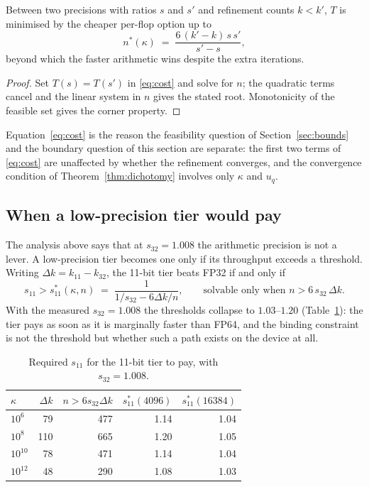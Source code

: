 \begin{proposition}\label{prop:corner}
Between two precisions with ratios $s$ and $s'$ and refinement counts $k<k'$,
$T$ is minimised by the cheaper per-flop option up to
\begin{equation}
  n^{\ast}(\kappa) \;=\; \frac{6\,(k'-k)\,s\,s'}{s'-s},
\end{equation}
beyond which the faster arithmetic wins despite the extra iterations.
\end{proposition}

\begin{proof}
Set $T(s)=T(s')$ in \eqref{eq:cost} and solve for $n$; the quadratic terms cancel
and the linear system in $n$ gives the stated root. Monotonicity of the feasible
set gives the corner property.
\end{proof}

\begin{remark}
Equation~\eqref{eq:cost} is the reason the feasibility question of
Section~\ref{sec:bounds} and the boundary question of this section are separate:
the first two terms of \eqref{eq:cost} are unaffected by whether the refinement
converges, and the convergence condition of Theorem~\ref{thm:dichotomy} involves
only $\kappa$ and $u_q$.
\end{remark}

\subsection{When a low-precision tier would pay}\label{par:impl}

The analysis above says that at $s_{32}=1.008$ the arithmetic precision is not a
lever. A low-precision tier becomes one only if its throughput exceeds a
threshold. Writing $\Delta k=k_{11}-k_{32}$, the 11-bit tier beats FP32 if and
only if
\begin{equation}
  s_{11} > s_{11}^{\ast}(\kappa,n) \;=\; \frac{1}{1/s_{32}-6\Delta k/n},
  \qquad\text{solvable only when } n>6\,s_{32}\,\Delta k .
\end{equation}
With the measured $s_{32}=1.008$ the thresholds collapse to $1.03$--$1.20$
(Table~\ref{tab:s11}): the tier pays as soon as it is marginally faster than
FP64, and the binding constraint is not the threshold but whether such a path
exists on the device at all.

\begin{table}[t]
  \centering
  \small
  \caption{Required $s_{11}$ for the 11-bit tier to pay, with $s_{32}=1.008$.}
  \label{tab:s11}
  \begin{tabular}{lrrrr}
    \toprule
    $\kappa$ & $\Delta k$ & $n>6s_{32}\Delta k$ & $s_{11}^\ast(4096)$ & $s_{11}^\ast(16384)$ \\
    \midrule
    $10^{6}$  & 79  & 477 & 1.14 & 1.04 \\
    $10^{8}$  & 110 & 665 & 1.20 & 1.05 \\
    $10^{10}$ & 78  & 471 & 1.14 & 1.04 \\
    $10^{12}$ & 48  & 290 & 1.08 & 1.03 \\
    \bottomrule
  \end{tabular}
\end{table}

